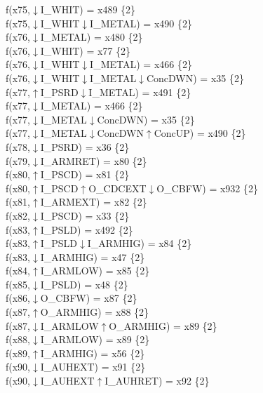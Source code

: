 f(x75,$\downarrow$I\_WHIT) = x489 \{2\} \\  
f(x75,$\downarrow$I\_WHIT$\downarrow$I\_METAL) = x490 \{2\} \\  
f(x76,$\downarrow$I\_METAL) = x480 \{2\} \\  
f(x76,$\downarrow$I\_WHIT) = x77 \{2\} \\  
f(x76,$\downarrow$I\_WHIT$\downarrow$I\_METAL) = x466 \{2\} \\  
f(x76,$\downarrow$I\_WHIT$\downarrow$I\_METAL$\downarrow$ConcDWN) = x35 \{2\} \\  
f(x77,$\uparrow$I\_PSRD$\downarrow$I\_METAL) = x491 \{2\} \\  
f(x77,$\downarrow$I\_METAL) = x466 \{2\} \\  
f(x77,$\downarrow$I\_METAL$\downarrow$ConcDWN) = x35 \{2\} \\  
f(x77,$\downarrow$I\_METAL$\downarrow$ConcDWN$\uparrow$ConcUP) = x490 \{2\} \\  
f(x78,$\downarrow$I\_PSRD) = x36 \{2\} \\  
f(x79,$\downarrow$I\_ARMRET) = x80 \{2\} \\  
f(x80,$\uparrow$I\_PSCD) = x81 \{2\} \\  
f(x80,$\uparrow$I\_PSCD$\uparrow$O\_CDCEXT$\downarrow$O\_CBFW) = x932 \{2\} \\  
f(x81,$\uparrow$I\_ARMEXT) = x82 \{2\} \\  
f(x82,$\downarrow$I\_PSCD) = x33 \{2\} \\  
f(x83,$\uparrow$I\_PSLD) = x492 \{2\} \\  
f(x83,$\uparrow$I\_PSLD$\downarrow$I\_ARMHIG) = x84 \{2\} \\  
f(x83,$\downarrow$I\_ARMHIG) = x47 \{2\} \\  
f(x84,$\uparrow$I\_ARMLOW) = x85 \{2\} \\  
f(x85,$\downarrow$I\_PSLD) = x48 \{2\} \\  
f(x86,$\downarrow$O\_CBFW) = x87 \{2\} \\  
f(x87,$\uparrow$O\_ARMHIG) = x88 \{2\} \\  
f(x87,$\downarrow$I\_ARMLOW$\uparrow$O\_ARMHIG) = x89 \{2\} \\  
f(x88,$\downarrow$I\_ARMLOW) = x89 \{2\} \\  
f(x89,$\uparrow$I\_ARMHIG) = x56 \{2\} \\  
f(x90,$\downarrow$I\_AUHEXT) = x91 \{2\} \\  
f(x90,$\downarrow$I\_AUHEXT$\uparrow$I\_AUHRET) = x92 \{2\} \\  
